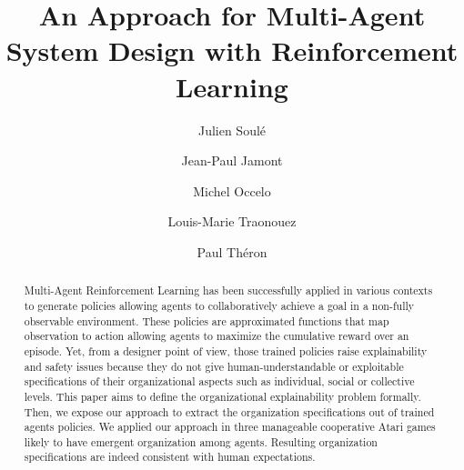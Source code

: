 \documentclass[runningheads]{llncs}
\begin{document}
%
\title{An Approach for Multi-Agent System Design with Reinforcement Learning}
%
%
\author{Julien Soulé \and
    Jean-Paul Jamont \and
    Michel Occelo \and
    Louis-Marie Traonouez \and
    Paul Théron}
%
%
%
\maketitle              %
%
\begin{abstract}

    Multi-Agent Reinforcement Learning has been successfully applied in various contexts to generate policies allowing agents to collaboratively achieve a goal in a non-fully observable environment. These policies are approximated functions that map observation to action allowing agents to maximize the cumulative reward over an episode.
    Yet, from a designer point of view, those trained policies raise explainability and safety issues because they do not give human-understandable or exploitable specifications of their organizational aspects such as individual, social or collective levels.
    This paper aims to define the organizational explainability problem formally. Then, we expose our approach to extract the organization specifications out of trained agents policies.
    We applied our approach in three manageable cooperative Atari games likely to have emergent organization among agents. Resulting organization specifications are indeed consistent with human expectations.
    
\end{abstract}
\end{document}
